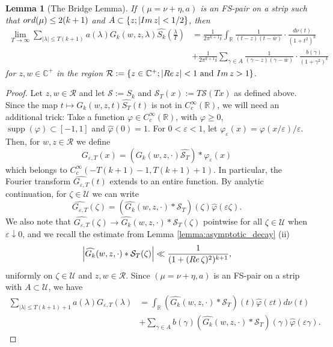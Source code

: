 \documentclass[10pt,a4paper]{amsart}
\newtheorem{lemma}{Lemma}
\renewcommand{\Im}{{\rm Im}\,}
\newcommand{\R}{\mathcal{R}}
\renewcommand{\Re}{{\rm Re}\,}
\renewcommand{\S}{\mathcal{S}}
\newcommand{\U}{\mathcal{U}}
\newcommand{\cd}{\cdot}
\newcommand{\cp}{\mathbb{C}} %
\newcommand{\ep}{\varepsilon}
\newcommand{\ft}{\widehat}
\newcommand{\ga}{\gamma}
\newcommand{\la}{\lambda}
\newcommand{\mt}{\mapsto}
\newcommand{\ord}{{\rm ord}}
\newcommand{\ov}[1]{\overline{#1}}
\newcommand{\p}{\varphi}
\renewcommand{\r}{\mathbb{R}}
\newcommand{\ra}{\rightarrow}
\DeclareMathOperator{\supp}{\mathrm{supp}}
\newcommand{\w}{\ov{w}}
\begin{document}
\begin{lemma}[The Bridge Lemma]
\label{thm:bridge}
If $(\mu=\nu+\eta,a)$ is an FS-pair on a strip such that $\ord(\mu)\leq 2(k+1)$ and $A\subset \{z;|\Im{z}|<1/2\}$, then
\begin{align}
\label{eq:bridge}
\lim_{T\ra\infty} \sum_{|\la|\leq T(k+1)} a(\la)G_k(w,z,\la){\ft{S_k}\left(\frac{\la}{T}\right)}&=\frac{1}{2\pi^{k+1}i}\int_{\r} \frac{1}{(t-z)(t-\w)}\cd\frac{d\nu(t)}{(1+t^2)^k}\\
&+\frac{1}{2\pi^{k+1}i}\sum_{\ga\in A} \frac{1}{(\ga-z)(\ga-\w)}\cd\frac{b(\ga)}{(1+\ga^2)^k}
\end{align}
for $z,w \in \cp^+$ in the region $\R:=\{z\in\cp^+;|\Re{z}|<1 \text{ and } \Im{z}>1\}$.
\end{lemma}

\begin{proof}
Let $z,w\in\R$ and let $\S:=S_k$ and $\S_T(x):=T\S(Tx)$ as defined above. Since the map $t\mt G_k(w,z,t)\ft{S_T}(t)$ is not in $C^{\infty}_c(\r)$, we will need an additional trick: Take a function $\p\in C^\infty_c(\r)$, with $\p\geq0$, $\supp(\p)\subset[-1,1]$ and $\ft{\p}(0)=1$. For $0<\ep<1$, let $\p_\ep(x)=\p(x/\ep)/\ep$. Then, for $w,z\in\R$ we define
\begin{equation}
G_{\ep,T}(x)=\left(G_k(w,z,\cd)\ft{\S_T}\right)*\p_\ep(x)
\end{equation}
which belongs to $C^\infty_c(-T(k+1)-1,T(k+1)+1)$. In particular, the Fourier transform $\ft{G_{\ep,T}}(t)$ extends to an entire function. By analytic continuation, for $\zeta\in\U$ we can write
\begin{equation}
\ft{G_{\ep,T}}(\zeta)=\left(\ft{G_k}(w,z,\cd)* \S_T\right)(\zeta)\ft{\p}(\ep \zeta).
\end{equation}
We also note that $\ft{G_{\ep,T}}(\zeta)\ra\ft{G_k}(w,z,\cd)* \S_T(\zeta)$ pointwise for all $\zeta\in\U$ when $\ep\downarrow0$, and we recall the estimate from Lemma \ref{lemma:asymptotic_decay} (ii)
\begin{equation}
\label{eq:unif_estimate_1}
\left|\ft{G_k}(w,z,\cd)* \S_T(\zeta)\right|\ll\frac{1}{(1+(\Re{\zeta})^2)^{k+1}},
\end{equation}
uniformly on $\zeta\in\U$ and $z,w\in\R$. Since $(\mu=\nu+\eta,a)$ is an FS-pair on a strip with $A\subset\U$, we have
\begin{align}
\sum_{|\la|\leq T(k+1)+1} a(\la)G_{\ep,T}(\la)&=\int_{\r} \left(\ft{G_k}(w,z,\cd)* \S_T\right)(t)\ft{\p}(\ep t) d\nu(t)\\&+\sum_{\ga\in A} b(\ga)\left(\ft{G_k}(w,z,\cd)* \S_T\right)(\ga)\ft{\p}(\ep \ga).

\end{align}
\end{proof}
\end{document}

